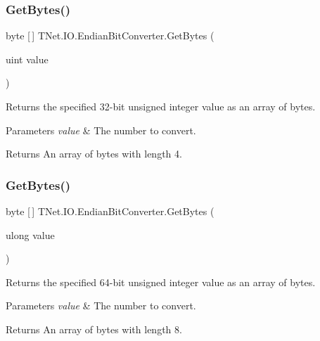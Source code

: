 \subsubsection{\texorpdfstring{Get\+Bytes()}{GetBytes()}\hspace{0.1cm}{\footnotesize\ttfamily [10/11]}}
{\footnotesize\ttfamily byte \mbox{[}$\,$\mbox{]} T\+Net.\+I\+O.\+Endian\+Bit\+Converter.\+Get\+Bytes (\begin{DoxyParamCaption}\item[{uint}]{value }\end{DoxyParamCaption})}



Returns the specified 32-\/bit unsigned integer value as an array of bytes. 


\begin{DoxyParams}{Parameters}
{\em value} & The number to convert.\\
\hline
\end{DoxyParams}
\begin{DoxyReturn}{Returns}
An array of bytes with length 4.
\end{DoxyReturn}
\mbox{\label{class_t_net_1_1_i_o_1_1_endian_bit_converter_a74f57e3195722e1f5d6f3049fcb1fe82}} 
\subsubsection{\texorpdfstring{Get\+Bytes()}{GetBytes()}\hspace{0.1cm}{\footnotesize\ttfamily [11/11]}}
{\footnotesize\ttfamily byte \mbox{[}$\,$\mbox{]} T\+Net.\+I\+O.\+Endian\+Bit\+Converter.\+Get\+Bytes (\begin{DoxyParamCaption}\item[{ulong}]{value }\end{DoxyParamCaption})}



Returns the specified 64-\/bit unsigned integer value as an array of bytes. 


\begin{DoxyParams}{Parameters}
{\em value} & The number to convert.\\
\hline
\end{DoxyParams}
\begin{DoxyReturn}{Returns}
An array of bytes with length 8.
\end{DoxyReturn}
\mbox{\label{class_t_net_1_1_i_o_1_1_endian_bit_converter_a6dfc6c331c6591940588f75d7a7e793e}} 

